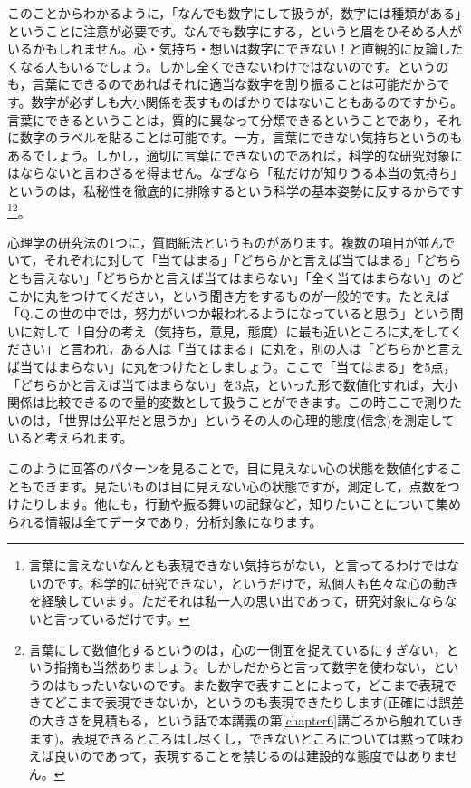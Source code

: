 \documentclass{ltjsbook}
\begin{document}
このことからわかるように，「なんでも数字にして扱うが，数字には種類がある」ということに注意が必要です。なんでも数字にする，というと眉をひそめる人がいるかもしれません。心・気持ち・想いは数字にできない！と直観的に反論したくなる人もいるでしょう。しかし全くできないわけではないのです。というのも，言葉にできるのであればそれに適当な数字を割り振ることは可能だからです。数字が必ずしも大小関係を表すものばかりではないこともあるのですから。言葉にできるということは，質的に異なって分類できるということであり，それに数字のラベルを貼ることは可能です。一方，言葉にできない気持ちというのもあるでしょう。しかし，適切に言葉にできないのであれば，科学的な研究対象にはならないと言わざるを得ません。なぜなら「私だけが知りうる本当の気持ち」というのは，私秘性を徹底的に排除するという科学の基本姿勢に反するからです\footnote{言葉に言えないなんとも表現できない気持ちがない，と言ってるわけではないのです。科学的に研究できない，というだけで，私個人も色々な心の動きを経験しています。ただそれは私一人の思い出であって，研究対象にならないと言っているだけです。}\footnote{言葉にして数値化するというのは，心の一側面を捉えているにすぎない，という指摘も当然ありましょう。しかしだからと言って数字を使わない，というのはもったいないのです。また数字で表すことによって，どこまで表現できてどこまで表現できないか，というのも表現できたりします(正確には誤差の大きさを見積もる，という話で本講義の第\ref{chapter6}講ごろから触れていきます)。表現できるところはし尽くし，できないところについては黙って味わえば良いのであって，表現することを禁じるのは建設的な態度ではありません。}。

心理学の研究法の1つに，質問紙法というものがあります。複数の項目が並んでいて，それぞれに対して「当てはまる」「どちらかと言えば当てはまる」「どちらとも言えない」「どちらかと言えば当てはまらない」「全く当てはまらない」のどこかに丸をつけてください，という聞き方をするものが一般的です。たとえば「Q.この世の中では，努力がいつか報われるようになっていると思う」という問いに対して「自分の考え（気持ち，意見，態度）に最も近いところに丸をしてください」と言われ，ある人は「当てはまる」に丸を，別の人は「どちらかと言えば当てはまらない」に丸をつけたとしましょう。ここで「当てはまる」を5点，「どちらかと言えば当てはまらない」を3点，といった形で数値化すれば，大小関係は比較できるので量的変数として扱うことができます。この時ここで測りたいのは，「世界は公平だと思うか」というその人の心理的態度(信念)を測定していると考えられます。

このように回答のパターンを見ることで，目に見えない心の状態を数値化することもできます。見たいものは目に見えない心の状態ですが，測定して，点数をつけたりします。他にも，行動や振る舞いの記録など，知りたいことについて集められる情報は全てデータであり，分析対象になります。
\end{document}
